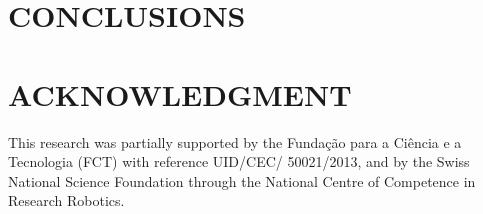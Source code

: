 \documentclass[letterpaper, 10 pt, conference]{ieeeconf}  %
\begin{document}
\section{CONCLUSIONS}



\addtolength{\textheight}{-12cm}   %








\section*{ACKNOWLEDGMENT}
This research was partially supported by the Funda\c{c}\~{a}o para a Ci\^{e}ncia
e a Tecnologia (FCT) with reference UID/CEC/ 50021/2013, and by the Swiss
National Science Foundation through the National Centre of Competence in
Research Robotics.









\end{document}
